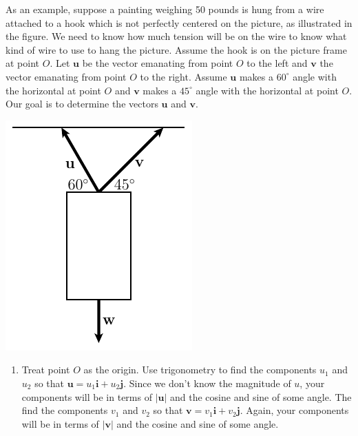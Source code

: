 \documentclass[10pt]{article}
\newcommand{\vu}{\mathbf{u}}
\newcommand{\vv}{\mathbf{v}}
\newcommand{\vi}{\mathbf{i}}
\newcommand{\vj}{\mathbf{j}}
\begin{document}
\begin{enumerate}[leftmargin=0pt]
\begin{minipage}[t]{0.5\linewidth}
    As an example, suppose a painting weighing 50 pounds is hung from a wire attached to a hook which is not perfectly centered on the picture, as illustrated in the figure. We need to know how much tension will be on the wire to know what kind of wire to use to hang the picture. Assume the hook is on the picture frame at point $O$. Let $\vu$ be the vector emanating from point $O$ to the left and $\vv$ the vector emanating from point $O$ to the right. Assume $\vu$ makes a $60^\circ$ angle with the horizontal at point $O$ and $\vv$ makes a $45^\circ$ angle with the horizontal at point $O$. Our goal is to determine the vectors $\vu$ and $\vv$.
    \end{minipage}
    \hfill
    \begin{minipage}[t]{0.4\linewidth}
    \vspace{0pt}
    \includegraphics[width=\linewidth]{fig_9_2_forces.pdf}
    \end{minipage}
    \begin{enumerate}
        \item Treat point $O$ as the origin. Use trigonometry to find the components $u_1$ and $u_2$ so that $\vu = u_1 \vi + u_2 \vj$. Since we don't know the magnitude of $u$, your components will be in terms of $|\vu|$ and the cosine and sine of some angle. The find the components $v_1$ and $v_2$ so that $\vv =v_1 \vi + v_2 \vj$. Again, your components will be in terms of $|\vv|$ and the cosine and sine of some angle.
        

\end{enumerate}
\end{enumerate}
\end{document}
